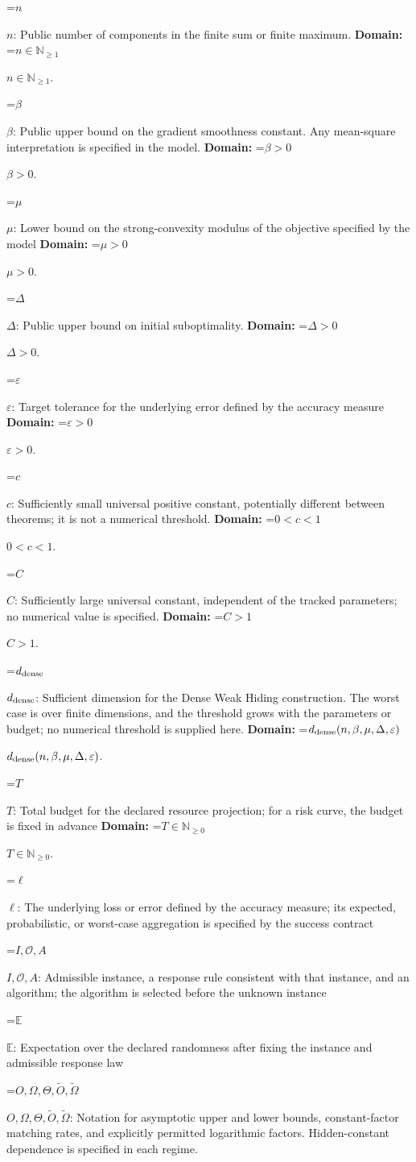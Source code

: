\documentclass[10pt,a4paper]{article}
\newcommand{\AtlasMath}[1]{\par\begingroup\centering\setbox0=\hbox{$\displaystyle #1$}\ifdim\wd0>1.4\linewidth\typeout{ATLAS WIDE FORMULA: \the\wd0}\fi\ifdim\wd0>\linewidth\resizebox{\linewidth}{!}{\box0}\else\box0\fi\par\endgroup}
\newcommand{\AtlasInlineMath}[1]{\begingroup\setbox0=\hbox{$#1$}\ifdim\wd0>.4\linewidth\endgroup\AtlasMath{#1}\else\endgroup$#1$\fi}
\begin{document}
\AtlasInlineMath{n}: Public number of components in the finite sum or finite maximum. \textbf{Domain:} \AtlasInlineMath{n\in\mathbb{N}_{\ge1}}.

\AtlasInlineMath{\beta}: Public upper bound on the gradient smoothness constant. Any mean-square interpretation is specified in the model. \textbf{Domain:} \AtlasInlineMath{\beta>0}.

\AtlasInlineMath{\mu}: Lower bound on the strong-convexity modulus of the objective specified by the model \textbf{Domain:} \AtlasInlineMath{\mu>0}.

\AtlasInlineMath{\Delta}: Public upper bound on initial suboptimality. \textbf{Domain:} \AtlasInlineMath{\Delta>0}.

\AtlasInlineMath{\varepsilon}: Target tolerance for the underlying error defined by the accuracy measure \textbf{Domain:} \AtlasInlineMath{\varepsilon>0}.

\AtlasInlineMath{c}: Sufficiently small universal positive constant, potentially different between theorems; it is not a numerical threshold. \textbf{Domain:} \AtlasInlineMath{0<c<1}.

\AtlasInlineMath{C}: Sufficiently large universal constant, independent of the tracked parameters; no numerical value is specified. \textbf{Domain:} \AtlasInlineMath{C>1}.

\AtlasInlineMath{d_{\rm dense}}: Sufficient dimension for the Dense Weak Hiding construction. The worst case is over finite dimensions, and the threshold grows with the parameters or budget; no numerical threshold is supplied here. \textbf{Domain:} \AtlasInlineMath{d_{\rm dense}(n,\beta,\mu,\Delta,\varepsilon)}.

\AtlasInlineMath{T}: Total budget for the declared resource projection; for a risk curve, the budget is fixed in advance \textbf{Domain:} \AtlasInlineMath{T\in\mathbb{N}_{\ge0}}.

\AtlasInlineMath{\ell}: The underlying loss or error defined by the accuracy measure; its expected, probabilistic, or worst-case aggregation is specified by the success contract

\AtlasInlineMath{I,\mathcal{O},A}: Admissible instance, a response rule consistent with that instance, and an algorithm; the algorithm is selected before the unknown instance

\AtlasInlineMath{\mathbb{E}}: Expectation over the declared randomness after fixing the instance and admissible response law

\AtlasInlineMath{O,\Omega,\Theta,\widetilde{O},\widetilde\Omega}: Notation for asymptotic upper and lower bounds, constant-factor matching rates, and explicitly permitted logarithmic factors. Hidden-constant dependence is specified in each regime.
\end{document}
